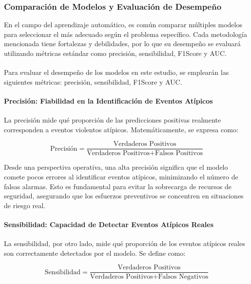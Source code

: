 \subsubsection*{Comparación de Modelos y Evaluación de Desempeño}

En el campo del {aprendizaje automático}, es común comparar múltiples modelos para seleccionar el más adecuado según el problema específico. Cada metodología mencionada tiene fortalezas y debilidades, por lo que su desempeño se evaluará utilizando métricas estándar como {precisión, sensibilidad, F1\-Score y AUC}.
\\\\
Para evaluar el desempeño de los modelos en este estudio, se emplearán las siguientes métricas: precisión, sensibilidad, F1\-Score y AUC.
\\\\
\textbf{Precisión: Fiabilidad en la Identificación de Eventos Atípicos}
\\\\
La precisión mide qué proporción de las predicciones positivas realmente corresponden a eventos violentos atípicos. Matemáticamente, se expresa como:

\begin{equation}
\text{Precisión} = \frac{\text{Verdaderos Positivos}}{\text{Verdaderos Positivos} + \text{Falsos Positivos}}
\end{equation}

Desde una perspectiva operativa, una alta precisión significa que el modelo comete pocos errores al identificar eventos atípicos, minimizando el número de falsas alarmas. Esto es fundamental para evitar la sobrecarga de recursos de seguridad, asegurando que los esfuerzos preventivos se concentren en situaciones de riesgo real.
\\\\
\textbf{Sensibilidad: Capacidad de Detectar Eventos Atípicos Reales}
\\\\
La sensibilidad, por otro lado, mide qué proporción de los eventos atípicos reales son correctamente detectados por el modelo. Se define como:

\begin{equation}
\text{Sensibilidad} = \frac{\text{Verdaderos Positivos}}{\text{Verdaderos Positivos} + \text{Falsos Negativos}}
\end{equation}

